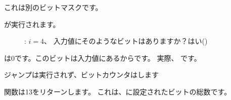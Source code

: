これは別のビットマスクです。

\clearpage
\AND が実行されます。

\begin{figure}[H]
\centering
{}
\caption{\olly: $i=4$、 
入力値にそのようなビットはありますか？はい()}
\label{fig:shifts_olly4_3}
\end{figure}

\ZF は0です。このビットは入力値にあるからです。
実際、 です。

ジャンプは実行されず、ビットカウンタはします

関数は13をリターンします。
これは、に設定されたビットの総数です。
